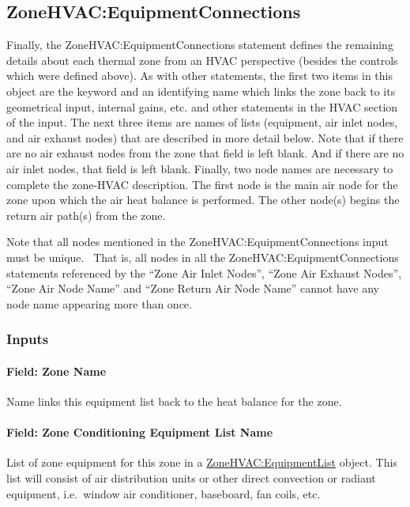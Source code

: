 \subsection{ZoneHVAC:EquipmentConnections}\label{zonehvacequipmentconnections}

Finally, the ZoneHVAC:EquipmentConnections statement defines the remaining details about each thermal zone from an HVAC perspective (besides the controls which were defined above). As with other statements, the first two items in this object are the keyword and an identifying name which links the zone back to its geometrical input, internal gains, etc. and other statements in the HVAC section of the input. The next three items are names of lists (equipment, air inlet nodes, and air exhaust nodes) that are described in more detail below. Note that if there are no air exhaust nodes from the zone that field is left blank. And if there are no air inlet nodes, that field is left blank. Finally, two node names are necessary to complete the zone-HVAC description. The first node is the main air node for the zone upon which the air heat balance is performed. The other node(s) begins the return air path(s) from the zone.

Note that all nodes mentioned in the ZoneHVAC:EquipmentConnections input must be unique.~ That is, all nodes in all the ZoneHVAC:EquipmentConnections statements referenced by the ``Zone Air Inlet Nodes'', ``Zone Air Exhaust Nodes'', ``Zone Air Node Name'' and ``Zone Return Air Node Name'' cannot have any node name appearing more than once.

\subsubsection{Inputs}\label{inputs-1-052}

\paragraph{Field: Zone Name}\label{field-zone-name-015}

Name links this equipment list back to the heat balance for the zone.

\paragraph{Field: Zone Conditioning Equipment List Name}\label{field-zone-conditioning-equipment-list-name}

List of zone equipment for this zone in a \hyperref[zonehvacequipmentlist]{ZoneHVAC:EquipmentList} object. This list will consist of air distribution units or other direct convection or radiant equipment, i.e.~window air conditioner, baseboard, fan coils, etc.

